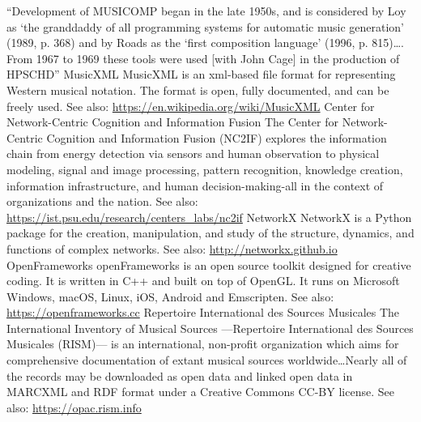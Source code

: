 	{``Development of MUSICOMP began in the late 1950s, and is considered by Loy as `the granddaddy of all programming systems for automatic music generation' (1989, p. 368) and by Roads as the `first composition language' (1996, p. 815)\dots. From 1967 to 1969 these tools were used [with John Cage] in the production of HPSCHD''
	{MusicXML}
	{MusicXML is an \gls{xml}-based file format for representing Western musical notation. The format is open, fully documented, and can be freely used. See also: \url{https://en.wikipedia.org/wiki/MusicXML}}
	{Center for Network-Centric Cognition and Information Fusion}
	{ The Center for Network-Centric Cognition and Information Fusion (NC2IF) explores the information chain from energy detection via sensors and human observation to physical modeling, signal and image processing, pattern recognition, knowledge creation, information infrastructure, and human decision-making-all in the context of organizations and the nation. See also: \url{https://ist.psu.edu/research/centers_labs/nc2if}}
	{NetworkX}
	{NetworkX is a Python package for the creation, manipulation, and study of the structure, dynamics, and functions of complex networks. See also: \url{http://networkx.github.io}}
	{OpenFrameworks}
	{openFrameworks is an open source toolkit designed for creative coding. It is written in C++ and built on top of OpenGL. It runs on Microsoft Windows, macOS, Linux, iOS, Android and Emscripten. See also: \url{https://openframeworks.cc}}
	{Repertoire International des Sources Musicales}
	{The International Inventory of Musical Sources ---Repertoire International des Sources Musicales (RISM)--- is an international, non-profit organization which aims for comprehensive documentation of extant musical sources worldwide\dots Nearly all of the records may be downloaded as open data and linked open data in MARCXML and RDF format under a Creative Commons CC-BY license. See also: \url{https://opac.rism.info}}
}
